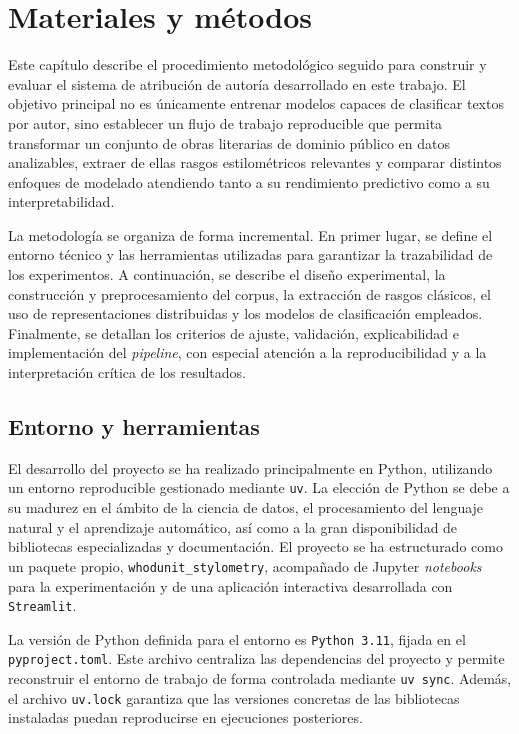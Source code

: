 \documentclass[IB]{TFUOC}%
\begin{document}
\chapter{Materiales y métodos}

Este capítulo describe el procedimiento metodológico seguido para construir y evaluar el sistema de atribución de autoría desarrollado en este trabajo. El objetivo principal no es únicamente entrenar modelos capaces de clasificar textos por autor, sino establecer un flujo de trabajo reproducible que permita transformar un conjunto de obras literarias de dominio público en datos analizables, extraer de ellas rasgos estilométricos relevantes y comparar distintos enfoques de modelado atendiendo tanto a su rendimiento predictivo como a su interpretabilidad.

La metodología se organiza de forma incremental. En primer lugar, se define el entorno técnico y las herramientas utilizadas para garantizar la trazabilidad de los experimentos. A continuación, se describe el diseño experimental, la construcción y preprocesamiento del corpus, la extracción de rasgos clásicos, el uso de representaciones distribuidas y los modelos de clasificación empleados. Finalmente, se detallan los criterios de ajuste, validación, explicabilidad e implementación del \textit{pipeline}, con especial atención a la reproducibilidad y a la interpretación crítica de los resultados.

\section{Entorno y herramientas}

El desarrollo del proyecto se ha realizado principalmente en Python\cite{PythonOfficialWebsite}, utilizando un entorno reproducible gestionado mediante \texttt{uv}\cite{UvnWeb}. La elección de Python se debe a su madurez en el ámbito de la ciencia de datos, el procesamiento del lenguaje natural y el aprendizaje automático, así como a la gran disponibilidad de bibliotecas especializadas y documentación. El proyecto se ha estructurado como un paquete propio, \texttt{whodunit\_stylometry}, acompañado de Jupyter \textit{notebooks} para la experimentación y de una aplicación interactiva desarrollada con \texttt{Streamlit}\cite{StreamlitWeb}.

La versión de Python definida para el entorno es \texttt{Python 3.11}, fijada en el \texttt{pyproject.toml}. Este archivo centraliza las dependencias del proyecto y permite reconstruir el entorno de trabajo de forma controlada mediante \texttt{uv sync}. Además, el archivo \texttt{uv.lock} garantiza que las versiones concretas de las bibliotecas instaladas puedan reproducirse en ejecuciones posteriores.
\end{document}
